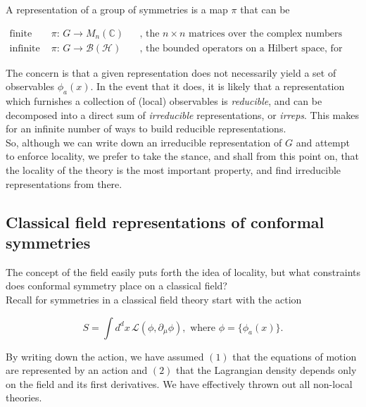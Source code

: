 \noindent A representation of a group of symmetries is a map $\pi$ that can be

\begin{align}
\text{finite } &\pi: \, G \rightarrow M_n (\mathbb{C}) &&\text{, the } n \times n \text{ matrices over the complex numbers} \\
\text{infinite } &\pi : \, G \rightarrow \mathcal{B}(\mathcal{H}) &&\text{, the bounded operators on a Hilbert space, for example.}
\end{align}

\noindent The concern is that a given representation does not necessarily yield a set of observables $\phi_a (x)$. In the event that it does, it is likely that a representation which furnishes a collection of (local) observables is \textit{reducible}, and can be decomposed into a direct sum of \textit{irreducible} representations, or \textit{irreps}. This makes for an infinite number of ways to build reducible representations. \\

\noindent So, although we can write down an irreducible representation of $G$ and attempt to enforce locality, we prefer to take the stance, and shall from this point on, that the locality of the theory is the most important property, and find irreducible representations from there. \\

\subsection*{Classical field representations of conformal symmetries}

\noindent The concept of the field easily puts forth the idea of locality, but what constraints does conformal symmetry place on a classical field? \\

\noindent Recall for symmetries in a classical field theory start with the action

\begin{equation}
S = \int d^d x \, \mathcal{L} (\phi, \partial_\mu \phi), \text{ where } \phi = \{ \phi_a (x) \}.
\end{equation}

\noindent By writing down the action, we have assumed $(1)$ that the equations of motion are represented by an action and $(2)$ that the Lagrangian density depends only on the field and its first derivatives. We have effectively thrown out all non-local theories. \\

